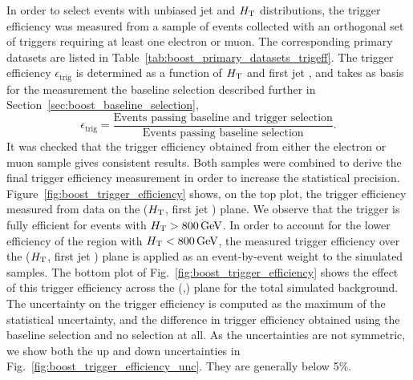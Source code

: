 In order to select events with unbiased jet \pt and $H_{\mathrm{T}}$ distributions,
the trigger efficiency was measured from a sample of events collected with an orthogonal set of
triggers requiring at least one electron or muon. The corresponding primary datasets are listed in
Table~\ref{tab:boost_primary_datasets_trigeff}. 
The trigger efficiency $\epsilon_\textrm{trig}$ is determined as a function of $H_{\mathrm{T}}$ and first jet
\pt, and takes as basis for the measurement the baseline selection described further in
Section~\ref{sec:boost_baseline_selection},
\begin{equation}
  \epsilon_\textrm{trig} = \frac{\textrm{Events passing baseline and trigger selection}}
{\textrm{Events passing baseline selection}}.
\end{equation}
It was checked that the trigger efficiency obtained from either the electron or muon sample gives 
consistent results. Both samples were combined to derive the final trigger efficiency measurement in 
order to increase the statistical precision.
Figure~\ref{fig:boost_trigger_efficiency} shows, on the top plot, the trigger efficiency
measured from data on the ($H_{\mathrm{T}}$, first jet \pt) plane.
We observe that the trigger is fully efficient for events with $H_{\mathrm{T}} > 800\,\text{Ge\hspace{-.08em}V}$.  
In order to account for the lower efficiency of the region with $H_{\mathrm{T}}  < 800\,\text{Ge\hspace{-.08em}V}$, the measured
trigger efficiency over the ($H_{\mathrm{T}}$, first jet \pt) plane is applied as an event-by-event weight
to the simulated samples. The bottom plot of Fig.~\ref{fig:boost_trigger_efficiency} shows the
effect of this trigger efficiency across the (\mr,\rsq) plane for the total simulated background. 
The uncertainty on the trigger efficiency is computed as the maximum of the statistical 
uncertainty, and the difference in trigger efficiency obtained using the baseline selection and no 
selection at all. As the uncertainties are not symmetric, we show both the up and down uncertainties
in Fig.~\ref{fig:boost_trigger_efficiency_unc}. They are generally below 5\%.   



